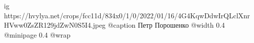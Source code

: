  
 
 
 
 

\ifcmt
  ig https://hvylya.net/crops/fcc11d/834x0/1/0/2022/01/16/4G4KqwDdwIrQLclXnrHVww0ZsZR129jdZwN0S5I4.jpeg
  @caption Петр Порошенко
  @width 0.4
  @minipage 0.4
  @wrap \parpic[r]
\fi
